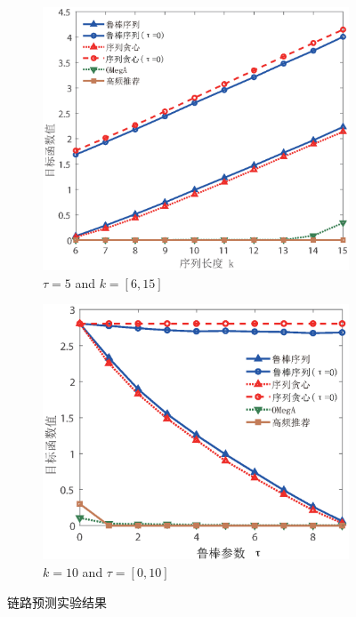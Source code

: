 \begin{figure}[H]
    \medskip

    \begin{subfigure}{0.45\textwidth}
       \includegraphics[width=\linewidth]{figure/rosenets/wik/wik-fun}
        \caption{$\tau=5$ and $k=[6,15]$}
        \label{fig:wik-fun}
    \end{subfigure}
    \hfill
    \begin{subfigure}{0.45\textwidth}
        \includegraphics[width=\linewidth]{figure/rosenets/wik/wik-fun-t}
        \caption{$k=10$ and $\tau=[0,10]$}
        \label{fig:wik-fun-t}
    \end{subfigure}
    \caption{链路预测实验结果\label{fig:wik}}
\end{figure}

